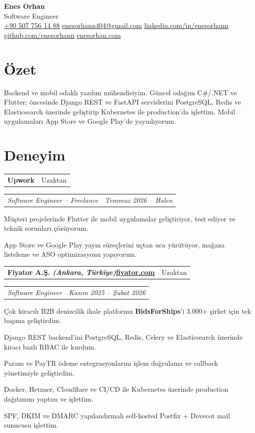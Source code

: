 \documentclass[10pt,a4paper]{extarticle}
\makeatletter
\newcommand{\sep}{\;\textperiodcentered\;}
\newcommand{\entry}[2]{%
\noindent\begin{tabular*}{\textwidth}{@{\extracolsep{\fill}}lr}
\textbf{#1} & #2\\
\end{tabular*}\vspace{1pt}
}
\newcommand{\subentry}[2]{%
\noindent\begin{tabular*}{\textwidth}{@{\extracolsep{\fill}}lr}
\textit{\color{muted}#1} & \textit{\color{muted}#2}\\
\end{tabular*}\vspace{2pt}
}
\makeatother
\begin{document}
\begin{center}
{\fontsize{23}{27}\selectfont\bfseries\color{accent}Enes Orhan}\\[4pt]
{\large\color{muted}Software Engineer}\;{\color{rulecol}\textbar}\\[6pt]
{\small
\href{tel:+905077561488}{+90 507 756 14 88}\sep
\href{mailto:enesorhann404@gmail.com}{enesorhann404@gmail.com}\sep
\href{https://linkedin.com/in/enesorhann}{linkedin.com/in/enesorhann}\sep
\href{https://github.com/enesorhann}{github.com/enesorhann}\sep
\href{https://enesorhan.com}{enesorhan.com}}
\end{center}

\section{Özet}
Backend ve mobil odaklı yazılım mühendisiyim. Güncel odağım C\#/.NET ve Flutter; öncesinde Django REST ve FastAPI servislerini
PostgreSQL, Redis ve Elasticsearch üzerinde geliştirip Kubernetes ile production'da işlettim. Mobil uygulamaları App Store ve
Google Play'de yayınlıyorum.

\section{Deneyim}

\entry{Upwork}{Uzaktan}
\subentry{Software Engineer -- Freelance}{Temmuz 2026 -- Halen}
\begin{bullets}
\item Müşteri projelerinde Flutter ile mobil uygulamalar geliştiriyor, test ediyor ve teknik sorunları çözüyorum.
\item App Store ve Google Play yayın süreçlerini uçtan uca yürütüyor, mağaza listeleme ve ASO optimizasyonu yapıyorum.
\end{bullets}

\vspace{2pt}
\entry{Fiyator A.Ş. \textit{(Ankara, Türkiye)}\sep\href{https://fiyator.com}{fiyator.com}}{Uzaktan}
\subentry{Software Engineer}{Kasım 2025 -- Şubat 2026}
\begin{bullets}
\item Çok kiracılı B2B denizcilik ihale platformu \textbf{BidsForShips}'i 3.000+ şirket için tek başıma geliştirdim.
\item Django REST backend'ini PostgreSQL, Redis, Celery ve Elasticsearch üzerinde kiracı bazlı RBAC ile kurdum.
\item Param ve PayTR ödeme entegrasyonlarını işlem doğrulama ve callback yönetimiyle geliştirdim.
\item Docker, Hetzner, Cloudflare ve CI/CD ile Kubernetes üzerinde production dağıtımını yaptım ve işlettim.
\item SPF, DKIM ve DMARC yapılandırmalı self-hosted Postfix + Dovecot mail sunucusu işlettim.
\end{bullets}
\end{document}
